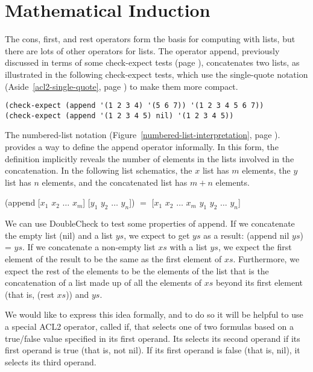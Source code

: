\section{Mathematical Induction}
\label{sec:induction}
The \textsf{cons}, \textsf{first}, and \textsf{rest} operators
form the basis for computing with lists,
but there are lots of other operators for lists.
The operator \textsf{append}, previously discussed in terms of some \textsf{check-expect} tests
(page \pageref{append-op-informal}), concatenates two lists, as illustrated
in the following \textsf{check-expect} tests,
which use the single-quote notation (Aside~\ref{acl2-single-quote}, page \pageref{acl2-single-quote})
to make them more compact.

\begin{Verbatim}
(check-expect (append '(1 2 3 4) '(5 6 7)) '(1 2 3 4 5 6 7))
(check-expect (append '(1 2 3 4 5) nil) '(1 2 3 4 5))
\end{Verbatim}

The numbered-list notation 
(Figure~\ref{numbered-list-interpretation}, page \pageref{numbered-list-interpretation}).
provides a way to define the \textsf{append} operator informally.
In this form, the definition implicitly reveals the number of elements in the lists
involved in the concatenation.
\label{list-schematic} In the following list schematics,
the $x$ list has $m$ elements, the $y$ list has $n$ elements,
and the concatenated list has $m+n$ elements.
\begin{samepage}
\begin{center}
\textsf{(append [$x_1$ $x_2$ $\dots$ $x_m$] [$y_1$ $y_2$ $\dots$ $y_n$])} $=$
\textsf{[$x_1$ $x_2$ $\dots$ $x_m$ $y_1$ $y_2$ $\dots$ $y_n$]}
\end{center}
\end{samepage}

We can use DoubleCheck to test some properties of \textsf{append}.
If we concatenate the empty list (\textsf{nil}) and a list $ys$,
we expect to get $ys$ as a result: \textsf{(append nil $ys$)} = $ys$.
If we concatenate a non-empty list $xs$ with a list $ys$,
we expect the first element of the result to be the same as
the first element of $xs$.
Furthermore, we expect the rest of the elements to be
the elements of the list that is the concatenation of
a list made up of all the elements of $xs$ beyond its first element
(that is, \textsf{(rest $xs$)}) and $ys$. 

We would like to express this idea formally,
and to do so it will be helpful to use a special ACL2 operator,
called \textsf{if},
that selects one of two formulas based on a true/false
value specified in its first operand.
Its selects its second operand if
its first operand is true (that is, not \textsf{nil}).
If its first operand is false (that is, \textsf{nil}),
it selects its third operand.


